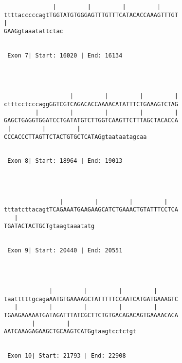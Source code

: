 \documentclass{article}
\begin{document}
\begin{Verbatim}
              |         |         |         |     
ttttacccccagtTGGTATGTGGGAGTTTGTTTCATACACCAAAGTTTGT
|   
GAAGgtaaatattctac


 Exon 7| Start: 16020 | End: 16134 




                   |         |         |         |
ctttcctcccaggGGTCGTCAGACACCAAAACATATTTCTGAAAGTCTAG
         |         |         |         |         |
GAGCTGAGGTGGATCCTGATATGTCTTGGTCAAGTTCTTTAGCTACACCA
 |         |         |      
CCCACCCTTAGTTCTACTGTGCTCATAGgtaataatagcaa


 Exon 8| Start: 18964 | End: 19013 




                |         |         |         |   
tttatcttacagtTCAGAAATGAAGAAGCATCTGAAACTGTATTTCCTCA
   |         
TGATACTACTGCTgtaagtaaatatg


 Exon 9| Start: 20440 | End: 20551 




             |         |         |         |      
taatttttgcagaAATGTGAAAAGCTATTTTTCCAATCATGATGAAAGTC
   |         |         |         |         |      
TGAAGAAAAATGATAGATTTATCGCTTCTGTGACAGACAGTGAAAACACA
        |         |      
AATCAAAGAGAAGCTGCAAGTCATGgtaagtcctctgt


 Exon 10| Start: 21793 | End: 22908 





\end{Verbatim}
\end{document}
